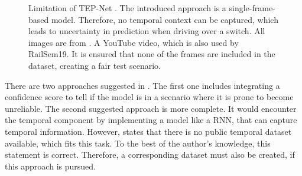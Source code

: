 \begin{figure}[H]
    \begin{minipage}{1.0\textwidth}
        \centering
    \end{minipage}

    \vspace{0.5cm}
    \caption{Limitation of \ac{TEP}-Net \cite{tepNet2024}. The introduced approach is a single-frame-based model. Therefore, no temporal context can be captured, which leads to uncertainty in prediction when driving over a switch.
    All images are from \cite{limitaion_youtube_video}. A YouTube video, which is also used by RailSem19. It is ensured that none of the frames are included in the dataset, creating a fair test scenario.}
    \label{fig:limitationSwitch}
\end{figure}

\vspace{0.5cm}

\noindent There are two approaches suggested in \cite{tepNet2024}.
The first one includes integrating a confidence score to tell if the model is in a scenario where it is prone to become unreliable.
The second suggested approach is more complete.
It would encounter the temporal component by implementing a model like a \ac{RNN}, that can capture temporal information.
However, \cite{tepNet2024} states that there is no public temporal dataset available, which fits this task.
To the best of the author's knowledge, this statement is correct.
Therefore, a corresponding dataset must also be created, if this approach is pursued.